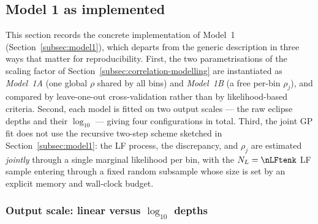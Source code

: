 %

\subsection{Model 1 as implemented}
\label{subsec:model1-implementation}

This section records the concrete implementation of Model~1
(Section~\ref{subsec:model1}), which departs from the generic description in
three ways that matter for reproducibility. First, the two parametrisations of
the scaling factor of Section~\ref{subsec:correlation-modelling} are
instantiated as \emph{Model~1A} (one global $\rho$ shared by all bins) and
\emph{Model~1B} (a free per-bin $\rho_j$), and compared by leave-one-out
cross-validation rather than by likelihood-based criteria. Second, each model
is fitted on two output scales --- the raw eclipse depths and their
$\log_{10}$ --- giving four configurations in total. Third, the joint
GP fit does not use the recursive two-step scheme sketched in
Section~\ref{subsec:model1}: the LF process, the discrepancy, and $\rho_j$ are
estimated \emph{jointly} through a single marginal likelihood per bin, with
the $N_L=\nLFtenk$ LF sample entering through a fixed random subsample whose
size is set by an explicit memory and wall-clock budget.

\subsubsection{Output scale: linear versus $\log_{10}$ depths}
\label{subsubsec:model1-logscale}

